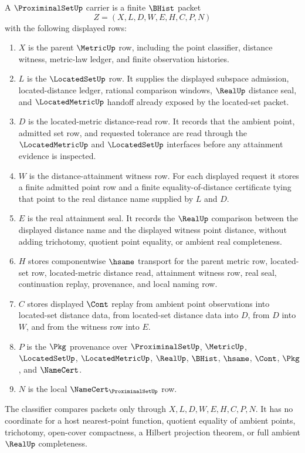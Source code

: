 \begin{definition}
\label{def:proximinal-set-carrier}
A $\ProximinalSetUp$ carrier is a finite $\BHist$ packet
$$
Z=(X,L,D,W,E,H,C,P,N)
$$
with the following displayed rows:
\begin{enumerate}
\item $X$ is the parent $\MetricUp$ row, including the point classifier, distance witness, metric-law ledger, and finite observation histories.
\item $L$ is the $\LocatedSetUp$ row. It supplies the displayed subspace admission, located-distance ledger, rational comparison windows, $\RealUp$ distance seal, and $\LocatedMetricUp$ handoff already exposed by the located-set packet.
\item $D$ is the located-metric distance-read row. It records that the ambient point, admitted set row, and requested tolerance are read through the $\LocatedMetricUp$ and $\LocatedSetUp$ interfaces before any attainment evidence is inspected.
\item $W$ is the distance-attainment witness row. For each displayed request it stores a finite admitted point row and a finite equality-of-distance certificate tying that point to the real distance name supplied by $L$ and $D$.
\item $E$ is the real attainment seal. It records the $\RealUp$ comparison between the displayed distance name and the displayed witness point distance, without adding trichotomy, quotient point equality, or ambient real completeness.
\item $H$ stores componentwise $\hsame$ transport for the parent metric row, located-set row, located-metric distance read, attainment witness row, real seal, continuation replay, provenance, and local naming row.
\item $C$ stores displayed $\Cont$ replay from ambient point observations into located-set distance data, from located-set distance data into $D$, from $D$ into $W$, and from the witness row into $E$.
\item $P$ is the $\Pkg$ provenance over $\ProximinalSetUp$, $\MetricUp$, $\LocatedSetUp$, $\LocatedMetricUp$, $\RealUp$, $\BHist$, $\hsame$, $\Cont$, $\Pkg$, and $\NameCert$.
\item $N$ is the local $\NameCert_{\ProximinalSetUp}$ row.
\end{enumerate}
The classifier compares packets only through $X,L,D,W,E,H,C,P,N$. It has no coordinate for a host nearest-point function, quotient equality of ambient points, trichotomy, open-cover compactness, a Hilbert projection theorem, or full ambient $\RealUp$ completeness.
\end{definition}


